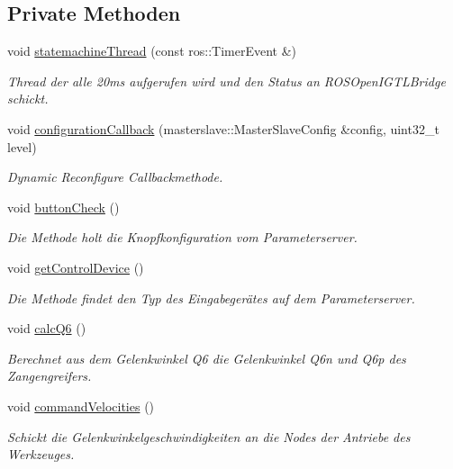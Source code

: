 \subsection*{Private Methoden}
\begin{DoxyCompactItemize}
\item 
void \hyperlink{classNumericKinematicCommander_ad156c4e1d46ef88533b9c95ce553b9a0}{statemachine\-Thread} (const ros\-::\-Timer\-Event \&)
\begin{DoxyCompactList}\small\item\em Thread der alle 20ms aufgerufen wird und den Status an R\-O\-S\-Open\-I\-G\-T\-L\-Bridge schickt. \end{DoxyCompactList}\item 
void \hyperlink{classNumericKinematicCommander_a0c35190f764d4e1eb7aa8a2f3f8304a9}{configuration\-Callback} (masterslave\-::\-Master\-Slave\-Config \&config, uint32\-\_\-t level)
\begin{DoxyCompactList}\small\item\em Dynamic Reconfigure Callbackmethode. \end{DoxyCompactList}\item 
void \hyperlink{classNumericKinematicCommander_a3c13e655370bc0a9d4d19f2d37dff112}{button\-Check} ()
\begin{DoxyCompactList}\small\item\em Die Methode holt die Knopfkonfiguration vom Parameterserver. \end{DoxyCompactList}\item 
void \hyperlink{classNumericKinematicCommander_a05f5cb46b14a1379080ebfff17581cff}{get\-Control\-Device} ()
\begin{DoxyCompactList}\small\item\em Die Methode findet den Typ des Eingabegerätes auf dem Parameterserver. \end{DoxyCompactList}\item 
void \hyperlink{classNumericKinematicCommander_a86e5dee090c011b84df0adc60114b2cc}{calc\-Q6} ()
\begin{DoxyCompactList}\small\item\em Berechnet aus dem Gelenkwinkel Q6 die Gelenkwinkel Q6n und Q6p des Zangengreifers. \end{DoxyCompactList}\item 
void \hyperlink{classNumericKinematicCommander_aaf3d53306acb883148ceacfd9f65e32d}{command\-Velocities} ()
\begin{DoxyCompactList}\small\item\em Schickt die Gelenkwinkelgeschwindigkeiten an die Nodes der Antriebe des Werkzeuges. \end{DoxyCompactList}\item 

\end{DoxyCompactItemize}
